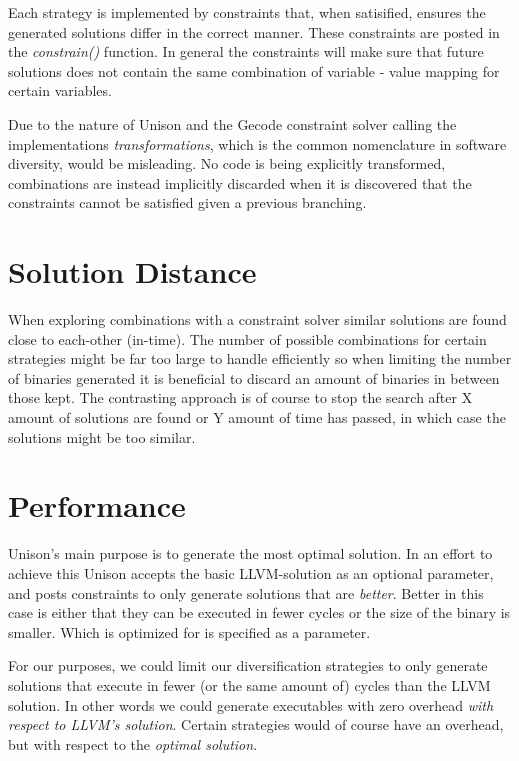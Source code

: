 Each strategy is implemented by constraints that, when satisified, ensures the
generated solutions differ in the correct manner. These constraints are posted in the
\textit{constrain()} function. In general the constraints will make sure that future
solutions does not contain the same combination of variable - value mapping for certain
variables.

Due to the nature of Unison and the Gecode constraint solver calling the implementations
\textit{transformations}, which is the common nomenclature in software diversity, would be
misleading. No code is being explicitly transformed, combinations are instead implicitly
discarded when it is discovered that the constraints cannot be satisfied given a previous
branching.



\section{Solution Distance}
When exploring combinations with a constraint solver similar solutions are found close to
each-other (in-time).  The number of possible combinations for certain strategies might be
far too large to handle efficiently so when limiting the number of binaries generated it is
beneficial to discard an amount of binaries in between those kept. The contrasting approach
is of course to stop the search after X amount of solutions are found or Y amount of time
has passed, in which case the solutions might be too similar.

\section{Performance}

Unison's main purpose is to generate the most optimal solution. In an effort to achieve
this Unison accepts the basic LLVM-solution as an optional parameter, and posts constraints
to only generate solutions that are \textit{better}. Better in this case is either that
they can be executed in fewer cycles or the size of the binary is smaller. Which is optimized
for is specified as a parameter.

For our purposes, we could limit our diversification strategies to only generate solutions
that execute in fewer (or the same amount of) cycles than the LLVM solution. In other words
we could generate executables with zero overhead \textit{with respect to LLVM's solution}.
Certain strategies would of course have an overhead, but with respect to the \textit{optimal
solution}.

